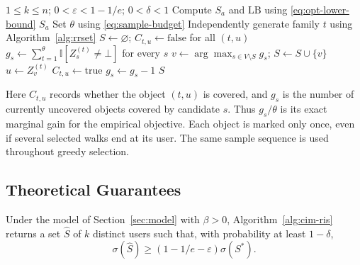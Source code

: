 \documentclass[sigconf]{acmart}
\newcommand{\CIMRIS}{\textsc{CIM-RIS}}
\newcommand{\I}{\mathbb{I}}
\begin{document}
\begin{algorithm}[t]
\caption{\CIMRIS{}$(G,k,\varepsilon,\delta)$ with Explicit Walk Sampling}
\label{alg:cim-ris}
\begin{algorithmic}[1]
\Require $1\leq k\leq n$; $0<\varepsilon<1-1/e$; $0<\delta<1$
\State Compute $S_a$ and $\mathrm{LB}$ using \eqref{eq:opt-lower-bound}
  \State \Return $S_a$
\EndIf
\State Set $\theta$ using \eqref{eq:sample-budget}
  \State Independently generate family $t$ using Algorithm~\ref{alg:rrset}
\EndFor
\State $S\gets\varnothing$; $C_{t,u}\gets\mathrm{false}$ for all $(t,u)$
\State $g_s\gets\sum_{t=1}^{\theta}\I[Z_s^{(t)}\ne\bot]$ for every $s$
  \State $v\gets\arg\max_{s\in V\setminus S}g_s$; $S\gets S\cup\{v\}$
    \State $u\gets Z_v^{(t)}$
        \State $C_{t,u}\gets\mathrm{true}$
          \State $g_s\gets g_s-1$
        \EndFor
      \EndIf
    \EndIf
  \EndFor
\EndFor
\State \Return $S$
\end{algorithmic}
\end{algorithm}

Here $C_{t,u}$ records whether the object $(t,u)$ is covered, and $g_s$
is the number of currently uncovered objects covered by candidate $s$.
Thus $g_s/\theta$ is its exact marginal gain for the empirical objective.
Each object is marked only once, even if several selected walks end at
its user. The same sample sequence is used throughout greedy selection.

\subsection{Theoretical Guarantees}

\begin{theorem}
\label{thm:approx}
Under the model of Section~\ref{sec:model} with $\beta>0$,
Algorithm~\ref{alg:cim-ris} returns a set $\hat S$ of $k$ distinct
users such that, with probability at least $1-\delta$,
\[
  \sigma(\hat S)\geq(1-1/e-\varepsilon)\sigma(S^*).
\]
\end{theorem}
\end{document}
